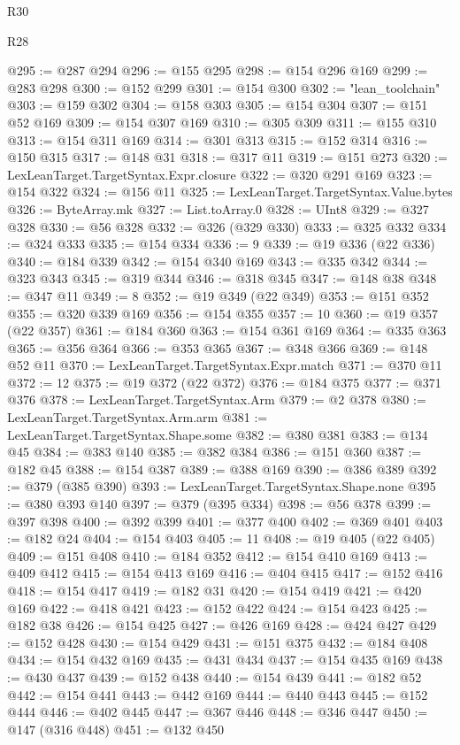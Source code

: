 \begin{lexlean}{R30}
\begin{lexlean}{R28}
\begin{coremodule}
{{{{{{{{{{{{{{{{{{{{{{{{{{{{{{{{{{{{{{{{{{{{{{{{{{{{{{{{{{{{{{{{{{{{{{{{{{{{{{{{{{{{{{{{{{{{{{{{{{{{{{{{{{{{{{{{{{{{{{{{{{{{{{{{{{{{{{{{{{{{{{{@295 := @287 @294
@296 := @155 @295
@298 := @154 @296 @169
@299 := @283 @298
@300 := @152 @299
@301 := @154 @300
@302 := "lean_toolchain"
@303 := @159 @302
@304 := @158 @303
@305 := @154 @304
@307 := @151 @52 @169
@309 := @154 @307 @169
@310 := @305 @309
@311 := @155 @310
@313 := @154 @311 @169
@314 := @301 @313
@315 := @152 @314
@316 := @150 @315
@317 := @148 @31
@318 := @317 @11
@319 := @151 @273
@320 := LexLeanTarget.TargetSyntax.Expr.closure
@322 := @320 @291 @169
@323 := @154 @322
@324 := @156 @11
@325 := LexLeanTarget.TargetSyntax.Value.bytes
@326 := ByteArray.mk
@327 := List.toArray.{0}
@328 := UInt8
@329 := @327 @328
@330 := @56 @328
@332 := @326 (@329 @330)
@333 := @325 @332
@334 := @324 @333
@335 := @154 @334
@336 := 9
@339 := @19 @336 (@22 @336)
@340 := @184 @339
@342 := @154 @340 @169
@343 := @335 @342
@344 := @323 @343
@345 := @319 @344
@346 := @318 @345
@347 := @148 @38
@348 := @347 @11
@349 := 8
@352 := @19 @349 (@22 @349)
@353 := @151 @352
@355 := @320 @339 @169
@356 := @154 @355
@357 := 10
@360 := @19 @357 (@22 @357)
@361 := @184 @360
@363 := @154 @361 @169
@364 := @335 @363
@365 := @356 @364
@366 := @353 @365
@367 := @348 @366
@369 := @148 @52 @11
@370 := LexLeanTarget.TargetSyntax.Expr.match
@371 := @370 @11
@372 := 12
@375 := @19 @372 (@22 @372)
@376 := @184 @375
@377 := @371 @376
@378 := LexLeanTarget.TargetSyntax.Arm
@379 := @2 @378
@380 := LexLeanTarget.TargetSyntax.Arm.arm
@381 := LexLeanTarget.TargetSyntax.Shape.some
@382 := @380 @381
@383 := @134 @45
@384 := @383 @140
@385 := @382 @384
@386 := @151 @360
@387 := @182 @45
@388 := @154 @387
@389 := @388 @169
@390 := @386 @389
@392 := @379 (@385 @390)
@393 := LexLeanTarget.TargetSyntax.Shape.none
@395 := @380 @393 @140
@397 := @379 (@395 @334)
@398 := @56 @378
@399 := @397 @398
@400 := @392 @399
@401 := @377 @400
@402 := @369 @401
@403 := @182 @24
@404 := @154 @403
@405 := 11
@408 := @19 @405 (@22 @405)
@409 := @151 @408
@410 := @184 @352
@412 := @154 @410 @169
@413 := @409 @412
@415 := @154 @413 @169
@416 := @404 @415
@417 := @152 @416
@418 := @154 @417
@419 := @182 @31
@420 := @154 @419
@421 := @420 @169
@422 := @418 @421
@423 := @152 @422
@424 := @154 @423
@425 := @182 @38
@426 := @154 @425
@427 := @426 @169
@428 := @424 @427
@429 := @152 @428
@430 := @154 @429
@431 := @151 @375
@432 := @184 @408
@434 := @154 @432 @169
@435 := @431 @434
@437 := @154 @435 @169
@438 := @430 @437
@439 := @152 @438
@440 := @154 @439
@441 := @182 @52
@442 := @154 @441
@443 := @442 @169
@444 := @440 @443
@445 := @152 @444
@446 := @402 @445
@447 := @367 @446
@448 := @346 @447
@450 := @147 (@316 @448)
@451 := @132 @450
}}}}}}}}}}}}}}}}}}}}}}}}}}}}}}}}}}}}}}}}}}}}}}}}}}}}}}}}}}}}}}}}}}}}}}}}}}}}}}}}}}}}}}}}}}}}}}}}}}}}}}}}}}}}}}}}}}}}}}}}}}}}}}}}}}}}}}}}}}}}}}}
\end{coremodule}
\end{lexlean}
\end{lexlean}
